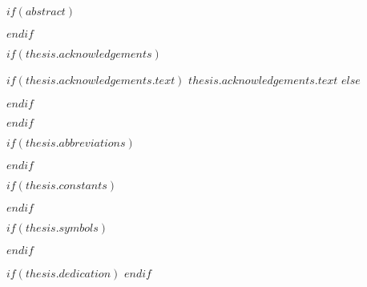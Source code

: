 $if(abstract)$
  \begin{abstract}
    \addchaptertocentry{\abstractname} %
    $abstract$
  \end{abstract}
$endif$

$if(thesis.acknowledgements)$
  \begin{acknowledgements}
    \addchaptertocentry{\acknowledgementname} %
    $if(thesis.acknowledgements.text)$
      $thesis.acknowledgements.text$
    $else$
      
    $endif$
  \end{acknowledgements}
$endif$

\begingroup
\hypersetup{linkcolor=$if(toclinkcolor)$$toclinkcolor$$else$black$endif$}

\tableofcontents   %
\listoffigures      %
\listoftables       %

\endgroup

$if(thesis.abbreviations)$
  
$endif$

$if(thesis.constants)$
  
$endif$

$if(thesis.symbols)$
  
$endif$

$if(thesis.dedication)$
  \dedicatory{} 
$endif$

\mainmatter %

\pagestyle{thesis}
